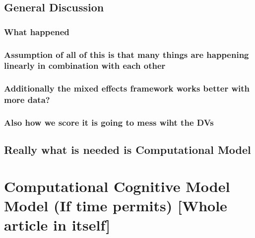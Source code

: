 \documentclass[]{book}
\theoremstyle{definition}
\theoremstyle{definition}
\theoremstyle{definition}
\theoremstyle{remark}
\begin{document}
\hypertarget{general-discussion}{%
\subsection{General Discussion}\label{general-discussion}}

\hypertarget{what-happened}{%
\subsubsection{What happened}\label{what-happened}}

\hypertarget{assumption-of-all-of-this-is-that-many-things-are-happening-linearly-in-combination-with-each-other}{%
\subsubsection{Assumption of all of this is that many things are
happening linearly in combination with each
other}\label{assumption-of-all-of-this-is-that-many-things-are-happening-linearly-in-combination-with-each-other}}

\hypertarget{additionally-the-mixed-effects-framework-works-better-with-more-data}{%
\subsubsection{Additionally the mixed effects framework works better
with more
data?}\label{additionally-the-mixed-effects-framework-works-better-with-more-data}}

\hypertarget{also-how-we-score-it-is-going-to-mess-wiht-the-dvs}{%
\subsubsection{Also how we score it is going to mess wiht the
DVs}\label{also-how-we-score-it-is-going-to-mess-wiht-the-dvs}}

\hypertarget{really-what-is-needed-is-computational-model}{%
\subsection{Really what is needed is Computational
Model}\label{really-what-is-needed-is-computational-model}}

\hypertarget{computational-cognitive-model-model-if-time-permits-whole-article-in-itself}{%
\section{Computational Cognitive Model Model (If time permits) {[}Whole
article in
itself{]}}\label{computational-cognitive-model-model-if-time-permits-whole-article-in-itself}}
\end{document}
